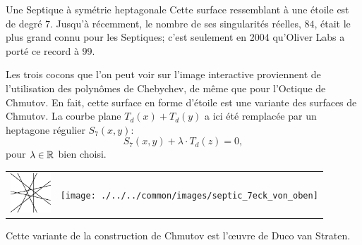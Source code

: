 \begin{surferPage}{Une Septique à symétrie heptagonale}
    Cette surface ressemblant à une étoile est de degré $7$.
    Jusqu'à récemment, le nombre de ses singularités réelles, $84$,
    était le plus grand connu pour les Septiques;
    c'est seulement en 2004 qu'Oliver Labs a porté ce record à $99$.
  
  
 Les trois cocons que l'on peut voir sur l'image interactive 
    proviennent de l'utilisation des polynômes de Chebychev, de même que pour l'Octique de Chmutov.
    En fait, cette surface en forme d'étoile est une variante des surfaces de Chmutov.
    La courbe plane $T_d(x)+T_d(y)$ a ici été remplacée par un heptagone régulier
    $S_7(x,y)$: 
   \[S_7(x,y) + \lambda \cdot T_d(z) = 0,\]
    pour $\lambda\in{\mathbb R}$ bien choisi. 
    \vspace*{-0.3em}
    \begin{center}
      \begin{tabular}{c@{\qquad}c}
        \includegraphics[height=1.5cm]{./../../common/images/labsseptic1.pdf}
        &
        \texttt{[image: ./../../common/images/septic\_7eck\_von\_oben]}
      \end{tabular}
    \end{center}
    \vspace*{-0.3em}   
   Cette variante de la construction de Chmutov est l'œuvre de Duco van Straten.
\end{surferPage}
